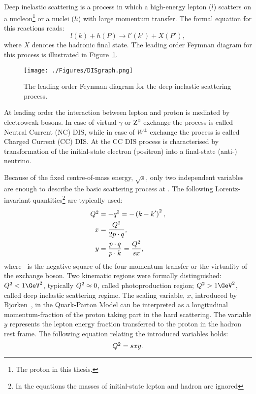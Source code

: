 Deep inelastic scattering is a process in which a high-energy lepton ($l$) scatters on a nucleon\footnote{The proton in this thesis.} or a nuclei ($h$) with large momentum transfer. The formal equation for this reactions reads:
\begin{equation}
l\left( k \right) + h\left( P \right) \rightarrow l'\left( k' \right) + X\left( P' \right),
\label{eq:DISreactions}
\end{equation}
where $X$ denotes the hadronic final state. The leading order Feymnan diagram for this process is illustrated in Figure~\ref{fig:DISgraph}.
\begin{figure}
	\centering
		\texttt{[image: ./Figures/DISgraph.png]}
	\caption{The leading order Feynman diagram for the deep inelastic scattering process.}
	\label{fig:DISgraph}
\end{figure}
At leading order the interaction between lepton and proton is mediated by electroweak bosons. In case of virtual $\gamma$ or $\mbox{$\rm{Z}^0$}$ exchange the process is called Neutral Current (NC) DIS, while in case of $W^\pm$ exchange the process is called Charged Current (CC) DIS. At \hera the CC DIS process is characterised by transformation of the initial-state electron (positron) into a final-state (anti-) neutrino.

Because of the fixed centre-of-mass energy, $\sqrt{s}$, only two independent variables are enough to describe the basic scattering process at \hera. The following Lorentz-invariant quantities\footnote{In the equations the masses of initial-state lepton and hadron are ignored} are typically used:
\begin{align}
\mbox{${Q^2}$} &= -q^2 = -\left( k - k' \right)^2,\\
     x &= \frac{\mbox{${Q^2}$}}{2p\cdot q},\\
		 y &= \frac{p\cdot q}{p\cdot k} = \frac{\mbox{${Q^2}$}}{sx},
\label{eq:vardefinit}
\end{align}
where \qsq\, is the negative square of the four-momentum transfer or the virtuality of the exchange boson. Two kinematic regions were formally distinguished: $\qsq < 1\GeV^2$, typically $\mbox{${Q^2}$} \approx 0$, called photoproduction region; $\qsq > 1\GeV^2$, called deep inelastic scattering regime. The scaling variable, $x$, introduced by Bjorken~\cite{bjorken}, in the Quark-Parton Model can be interpreted as a longitudinal momentum-fraction of the proton taking part in the hard scattering. The variable $y$ represents the lepton energy fraction transferred to the proton in the hadron rest frame. The following equation relating the introduced variables holds:
\begin{equation}
\mbox{${Q^2}$} = sxy.
\label{eq:qsxy}
\end{equation}


